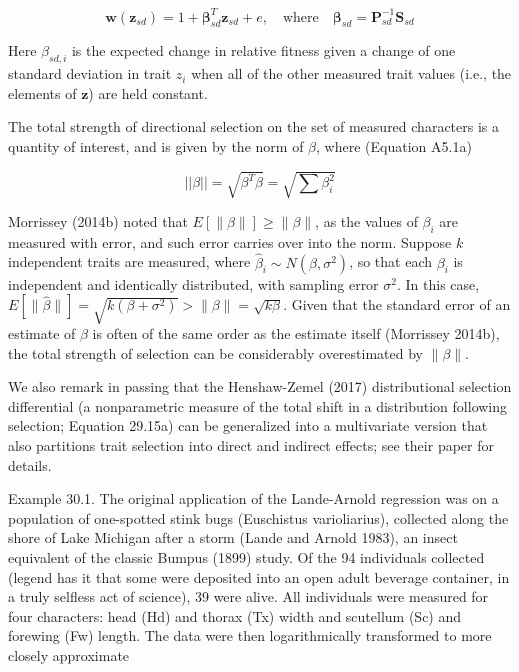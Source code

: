 \documentclass{article}
\begin{document}
\begin{equation}
\boldsymbol{w}(\mathbf{z}_{s d})=1+\boldsymbol{\beta}_{s d}^{T}\mathbf{z}_{s d}+e,\quad\mathrm{w h e r e}\quad\boldsymbol{\beta}_{s d}=\mathbf{P}_{s d}^{-1}\mathbf{S}_{s d}
\end{equation}

Here  $ \beta_{sd,i} $ is the expected change in relative fitness given a change of one standard deviation in trait  $ z_i $ when all of the other measured trait values (i.e., the elements of  $ \mathbf{z} $) are held constant.

The total strength of directional selection on the set of measured characters is a quantity of interest, and is given by the norm of  $ \beta $, where (Equation A5.1a)

\begin{equation}
||\beta||=\sqrt{\beta^{T}\beta}=\sqrt{\sum\beta_{i}^{2}}
\end{equation}

Morrissey (2014b) noted that  $ E[\|\beta\|] \geq \|\beta\| $, as the values of  $ \beta_i $ are measured with error, and such error carries over into the norm. Suppose  $ k $ independent traits are measured, where  $ \widehat{\beta}_i \sim N(\beta, \sigma^2) $, so that each  $ \beta_i $ is independent and identically distributed, with sampling error  $ \sigma^2 $. In this case,  $ E[\|\widehat{\beta}\|] = \sqrt{k(\beta + \sigma^2)} > \|\beta\| = \sqrt{k\beta} $. Given that the standard error of an estimate of  $ \beta $ is often of the same order as the estimate itself (Morrissey 2014b), the total strength of selection can be considerably overestimated by  $ \|\beta\| $.

We also remark in passing that the Henshaw-Zemel (2017) distributional selection differential (a nonparametric measure of the total shift in a distribution following selection; Equation 29.15a) can be generalized into a multivariate version that also partitions trait selection into direct and indirect effects; see their paper for details.

Example 30.1. The original application of the Lande-Arnold regression was on a population of one-spotted stink bugs (Euschistus varioliarius), collected along the shore of Lake Michigan after a storm (Lande and Arnold 1983), an insect equivalent of the classic Bumpus (1899) study. Of the 94 individuals collected (legend has it that some were deposited into an open adult beverage container, in a truly selfless act of science), 39 were alive. All individuals were measured for four characters: head (Hd) and thorax (Tx) width and scutellum (Sc) and forewing (Fw) length. The data were then logarithmically transformed to more closely approximate
\end{document}
